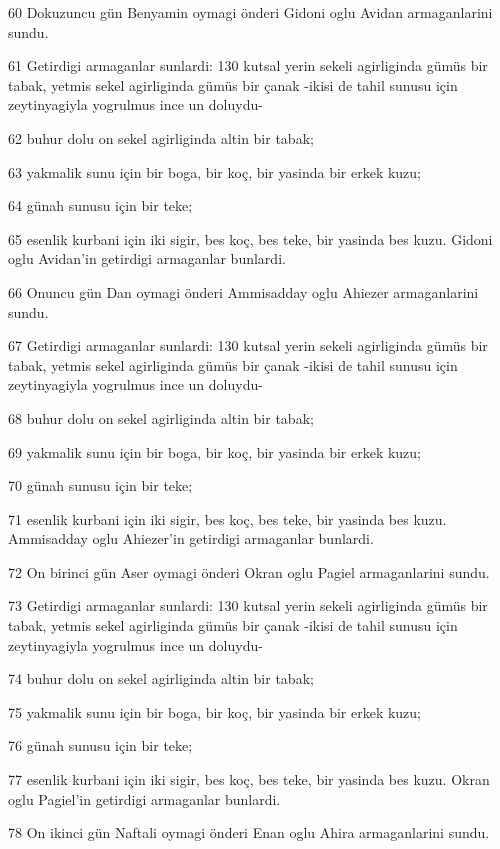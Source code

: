 \par 60 Dokuzuncu gün Benyamin oymagi önderi Gidoni oglu Avidan armaganlarini sundu.
\par 61 Getirdigi armaganlar sunlardi: 130 kutsal yerin sekeli agirliginda gümüs bir tabak, yetmis sekel agirliginda gümüs bir çanak -ikisi de tahil sunusu için zeytinyagiyla yogrulmus ince un doluydu-
\par 62 buhur dolu on sekel agirliginda altin bir tabak;
\par 63 yakmalik sunu için bir boga, bir koç, bir yasinda bir erkek kuzu;
\par 64 günah sunusu için bir teke;
\par 65 esenlik kurbani için iki sigir, bes koç, bes teke, bir yasinda bes kuzu. Gidoni oglu Avidan'in getirdigi armaganlar bunlardi.
\par 66 Onuncu gün Dan oymagi önderi Ammisadday oglu Ahiezer armaganlarini sundu.
\par 67 Getirdigi armaganlar sunlardi: 130 kutsal yerin sekeli agirliginda gümüs bir tabak, yetmis sekel agirliginda gümüs bir çanak -ikisi de tahil sunusu için zeytinyagiyla yogrulmus ince un doluydu-
\par 68 buhur dolu on sekel agirliginda altin bir tabak;
\par 69 yakmalik sunu için bir boga, bir koç, bir yasinda bir erkek kuzu;
\par 70 günah sunusu için bir teke;
\par 71 esenlik kurbani için iki sigir, bes koç, bes teke, bir yasinda bes kuzu. Ammisadday oglu Ahiezer'in getirdigi armaganlar bunlardi.
\par 72 On birinci gün Aser oymagi önderi Okran oglu Pagiel armaganlarini sundu.
\par 73 Getirdigi armaganlar sunlardi: 130 kutsal yerin sekeli agirliginda gümüs bir tabak, yetmis sekel agirliginda gümüs bir çanak -ikisi de tahil sunusu için zeytinyagiyla yogrulmus ince un doluydu-
\par 74 buhur dolu on sekel agirliginda altin bir tabak;
\par 75 yakmalik sunu için bir boga, bir koç, bir yasinda bir erkek kuzu;
\par 76 günah sunusu için bir teke;
\par 77 esenlik kurbani için iki sigir, bes koç, bes teke, bir yasinda bes kuzu. Okran oglu Pagiel'in getirdigi armaganlar bunlardi.
\par 78 On ikinci gün Naftali oymagi önderi Enan oglu Ahira armaganlarini sundu.
